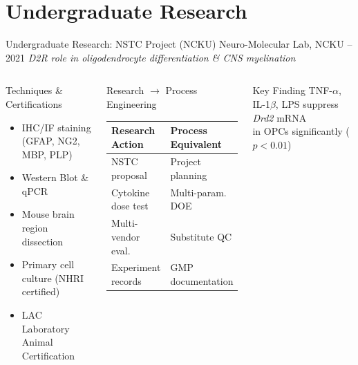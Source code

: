 \documentclass[aspectratio=169,10pt]{beamer}
\begin{document}
\section{Undergraduate Research}
\begin{frame}{Undergraduate Research: NSTC Project (NCKU)}
  {\small Neuro-Molecular Lab, NCKU --2021 \quad
   \textit{D2R role in oligodendrocyte differentiation \& CNS myelination}}

  \vspace{0.1cm}
  \begin{columns}[T]
      \begin{block}{Techniques \& Certifications}
        \small
        \begin{itemize}
          \item IHC/IF staining (GFAP, NG2, MBP, PLP)
          \item Western Blot \& qPCR
          \item Mouse brain region dissection
          \item Primary cell culture (NHRI certified)
          \item LAC Laboratory Animal Certification
        \end{itemize}
      \end{block}

      \begin{block}{Research $\to$ Process Engineering}
        \footnotesize
        \begin{tabular}{p{2.6cm}p{2.7cm}}
          \toprule
          Research Action & Process Equivalent \\
          \midrule
          NSTC proposal        & Project planning \\
          Cytokine dose test   & Multi-param. DOE \\
          Multi-vendor eval.   & Substitute QC \\
          Experiment records   & GMP documentation \\
          \bottomrule
        \end{tabular}
      \end{block}
      \vspace{0.1cm}
      \begin{exampleblock}{Key Finding}
        \footnotesize
        TNF-$\alpha$, IL-1$\beta$, LPS suppress \textit{Drd2} mRNA\\
        in OPCs significantly ($p < 0.01$)
      \end{exampleblock}
  \end{columns}
\end{frame}
\end{document}
